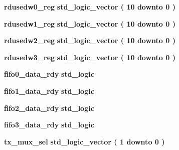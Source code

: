 \begin{DoxyCompactItemize}
\item 
{\bf rdusedw0\+\_\+reg} {\bfseries \textcolor{comment}{std\+\_\+logic\+\_\+vector}\textcolor{vhdlchar}{ }\textcolor{vhdlchar}{(}\textcolor{vhdlchar}{ }\textcolor{vhdlchar}{ } \textcolor{vhdldigit}{10} \textcolor{vhdlchar}{ }\textcolor{keywordflow}{downto}\textcolor{vhdlchar}{ }\textcolor{vhdlchar}{ } \textcolor{vhdldigit}{0} \textcolor{vhdlchar}{ }\textcolor{vhdlchar}{)}\textcolor{vhdlchar}{ }} 
\item 
{\bf rdusedw1\+\_\+reg} {\bfseries \textcolor{comment}{std\+\_\+logic\+\_\+vector}\textcolor{vhdlchar}{ }\textcolor{vhdlchar}{(}\textcolor{vhdlchar}{ }\textcolor{vhdlchar}{ } \textcolor{vhdldigit}{10} \textcolor{vhdlchar}{ }\textcolor{keywordflow}{downto}\textcolor{vhdlchar}{ }\textcolor{vhdlchar}{ } \textcolor{vhdldigit}{0} \textcolor{vhdlchar}{ }\textcolor{vhdlchar}{)}\textcolor{vhdlchar}{ }} 
\item 
{\bf rdusedw2\+\_\+reg} {\bfseries \textcolor{comment}{std\+\_\+logic\+\_\+vector}\textcolor{vhdlchar}{ }\textcolor{vhdlchar}{(}\textcolor{vhdlchar}{ }\textcolor{vhdlchar}{ } \textcolor{vhdldigit}{10} \textcolor{vhdlchar}{ }\textcolor{keywordflow}{downto}\textcolor{vhdlchar}{ }\textcolor{vhdlchar}{ } \textcolor{vhdldigit}{0} \textcolor{vhdlchar}{ }\textcolor{vhdlchar}{)}\textcolor{vhdlchar}{ }} 
\item 
{\bf rdusedw3\+\_\+reg} {\bfseries \textcolor{comment}{std\+\_\+logic\+\_\+vector}\textcolor{vhdlchar}{ }\textcolor{vhdlchar}{(}\textcolor{vhdlchar}{ }\textcolor{vhdlchar}{ } \textcolor{vhdldigit}{10} \textcolor{vhdlchar}{ }\textcolor{keywordflow}{downto}\textcolor{vhdlchar}{ }\textcolor{vhdlchar}{ } \textcolor{vhdldigit}{0} \textcolor{vhdlchar}{ }\textcolor{vhdlchar}{)}\textcolor{vhdlchar}{ }} 
\item 
{\bf fifo0\+\_\+data\+\_\+rdy} {\bfseries \textcolor{comment}{std\+\_\+logic}\textcolor{vhdlchar}{ }} 
\item 
{\bf fifo1\+\_\+data\+\_\+rdy} {\bfseries \textcolor{comment}{std\+\_\+logic}\textcolor{vhdlchar}{ }} 
\item 
{\bf fifo2\+\_\+data\+\_\+rdy} {\bfseries \textcolor{comment}{std\+\_\+logic}\textcolor{vhdlchar}{ }} 
\item 
{\bf fifo3\+\_\+data\+\_\+rdy} {\bfseries \textcolor{comment}{std\+\_\+logic}\textcolor{vhdlchar}{ }} 
\item 
{\bf tx\+\_\+mux\+\_\+sel} {\bfseries \textcolor{comment}{std\+\_\+logic\+\_\+vector}\textcolor{vhdlchar}{ }\textcolor{vhdlchar}{(}\textcolor{vhdlchar}{ }\textcolor{vhdlchar}{ } \textcolor{vhdldigit}{1} \textcolor{vhdlchar}{ }\textcolor{keywordflow}{downto}\textcolor{vhdlchar}{ }\textcolor{vhdlchar}{ } \textcolor{vhdldigit}{0} \textcolor{vhdlchar}{ }\textcolor{vhdlchar}{)}\textcolor{vhdlchar}{ }} 

\end{DoxyCompactItemize}

